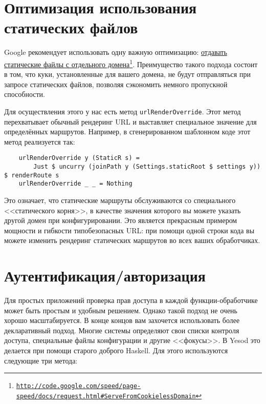 \section {Оптимизация использования статических файлов}

Google рекомендует использовать одну важную оптимизацию:
\href{http://code.google.com/speed/page-speed/docs/request.html\#ServeFromCookielessDomain}{отдавать
    статические файлы с отдельного
    домена}\footnote{\href{http://code.google.com/speed/page-speed/docs/request.html\#ServeFromCookielessDomain}{\texttt{http://code.google.com/speed/page-speed/docs/request.html\#ServeFromCookielessDomain}}}.
Преимущество такого подхода состоит в том, что куки, установленные для вашего
домена, не будут отправляться при запросе статических файлов, позволяя
сэкономить немного пропускной способности.

Для осуществления этого у нас есть метод \lstinline!urlRenderOverride!. Этот
метод перехватывает обычный рендеринг URL и выставляет специальное значение для
определённых маршрутов. Например, в сгенерированном шаблонном коде этот метод
реализуется так:

\begin{lstlisting}
    urlRenderOverride y (StaticR s) =
        Just $ uncurry (joinPath y (Settings.staticRoot $ settings y)) $ renderRoute s
    urlRenderOverride _ _ = Nothing
\end{lstlisting}%

Это означает, что статические маршруты обслуживаются со специального
<<статического корня>>, в качестве значения которого вы можете указать другой
домен при конфигурировании. Это является прекрасным примером мощности и
гибкости типобезопасных URL: при помощи одной строки кода вы можете изменить
рендеринг статических маршрутов во всех ваших обработчиках.

\section {Аутентификация/авторизация}

Для простых приложений проверка прав доступа в каждой функции-обработчике может
быть простым и удобным решением. Однако такой подход не очень хорошо
масштабируется. В конце концов вам захочется использовать более декларативный
подход. Многие системы определяют свои списки контроля доступа, специальные
файлы конфигурации и другие <<фокусы>>. В Yesod это делается при помощи старого
доброго Haskell. Для этого используются следующие три метода:

